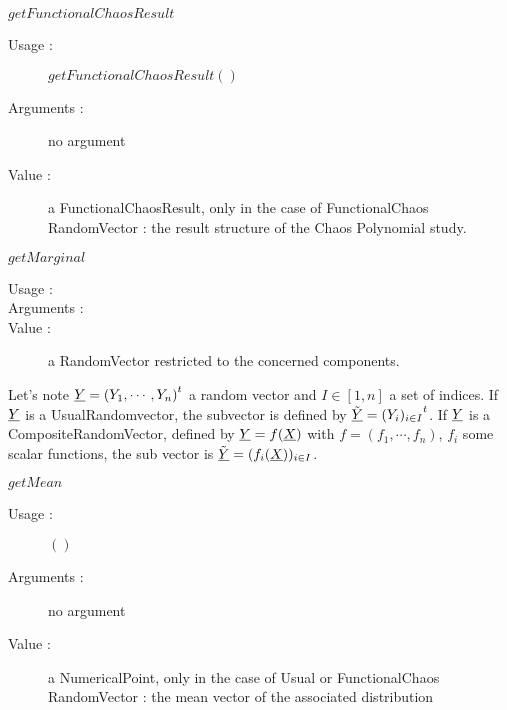 \begin{description}
\begin{description}
  \item $getFunctionalChaosResult$
    \begin{description}
    \item[Usage :] $getFunctionalChaosResult()$
    \item[Arguments :] no argument
    \item[Value :] a FunctionalChaosResult, only in the case of FunctionalChaos RandomVector : the  result structure of the Chaos Polynomial study.
    \end{description}
    \bigskip


  \item $getMarginal$
    \begin{description}
    \item[Usage :] \rule{0pt}{1em}
    \item[Arguments :] \rule{0pt}{1em}
    \item[Value :] a RandomVector restricted to the concerned components.
    \end{description}
  \item[Details :] Let's note ${\underline{Y}} = {{(Y_1, \cdots, Y_n)}^t}$ a random vector and $I \in [1, n]$ a set of indices. If ${\underline{Y}}$ is a UsualRandomvector, the subvector is defined by ${\underline{\tilde{Y}}} = {{(Y_i)_{i \in I}}^t}$. If ${\underline{Y}}$ is a CompositeRandomVector, defined by ${\underline{Y}} = f({\underline{X}})$ with $f = (f_1, \cdots, f_n)$, $f_i$ some scalar functions, the sub vector is ${\underline{\tilde{Y}}} = (f_i({\underline{X}}))_{i \in I}$.
    \bigskip
  \item $getMean$
    \begin{description}
    \item[Usage :] $()$
    \item[Arguments :] no argument
    \item[Value :] a NumericalPoint, only in the case of Usual or FunctionalChaos RandomVector : the mean vector of the associated distribution
    \end{description}
    \bigskip


\end{description}
\end{description}
